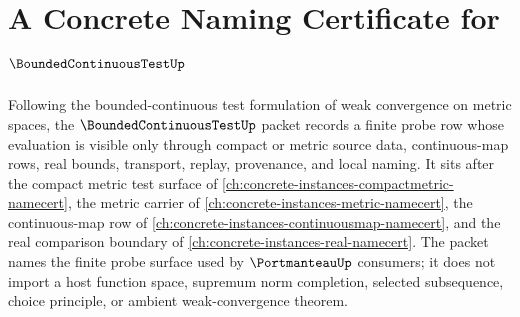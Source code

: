 \chapter{A Concrete Naming Certificate for $\BoundedContinuousTestUp$}
\label{ch:concrete-instances-bounded-continuous-test-namecert}

Following the bounded-continuous test formulation of weak convergence on
metric spaces, the $\BoundedContinuousTestUp$ packet records a finite probe row
whose evaluation is visible only through compact or metric source data,
continuous-map rows, real bounds, transport, replay, provenance, and local
naming. It sits after the compact metric test surface of
\autoref{ch:concrete-instances-compactmetric-namecert}, the metric carrier of
\autoref{ch:concrete-instances-metric-namecert}, the continuous-map row of
\autoref{ch:concrete-instances-continuousmap-namecert}, and the real
comparison boundary of \autoref{ch:concrete-instances-real-namecert}. The
packet names the finite probe surface used by $\PortmanteauUp$ consumers; it
does not import a host function space, supremum norm completion, selected
subsequence, choice principle, or ambient weak-convergence theorem.

